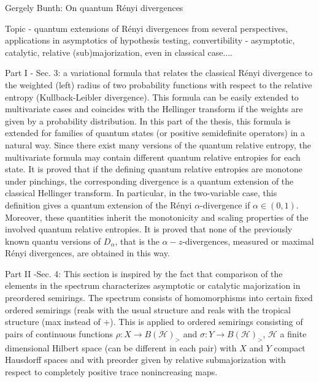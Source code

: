 \documentclass[12pt]{article}
\begin{document}
\begin{center}
{\large Gergely Bunth: On quantum R\'enyi divergences }

\end{center}
\medskip


\bigskip

Topic - quantum extensions of R\'enyi divergences from several perspectives, 
applications in asymptotics of hypothesis testing, convertibility - asymptotic, catalytic, relative
(sub)majorization, even in classical case....

Part I - Sec. 3: a variational formula that relates the classical R\'enyi divergence to the
weighted (left) radius of two probability functions with respect to the relative entropy
(Kullback-Leibler divergence). This formula can be easily extended to multivariate
cases and coincides with the Hellinger transform if the weights are given by a probability
distribution.
In this part of the thesis, this formula is extended for families of quantum states
(or positive semidefinite operators) in a natural way. Since there exist many versions of the quantum
relative entropy, the multivariate formula may contain different quantum relative
entropies for each state. It is proved that if the defining quantum relative entropies are
monotone under pinchings, the corresponding divergence is a quantum extension of the
classical Hellinger transform. In particular, in the two-variable case, this definition gives a quantum extension of the 
R\'enyi $\alpha$-divergence if $\alpha\in (0,1)$. Moreover, these quantities inherit the
monotonicity and scaling properties of the involved quantum relative entropies.
It is proved that none of the previously known quantu versions of $D_\alpha$, that is the
$\alpha-z$-divergences, measured or maximal R\'enyi divergences, are obtained in this way.


Part II -Sec. 4: This section is inspired by the fact  that comparison of the  elements in the
spectrum characterizes asymptotic or catalytic majorization in preordered semirings. 
The spectrum consists of homomorphisms into certain fixed ordered semirings (reals with
the usual structure and reals with the tropical structure (max instead of +). 
This is applied to ordered semirings consisting of  pairs of continuous functions $\rho:X\to B(\mathcal H)_>$ and
$\sigma:Y\to B(\mathcal H)_>$, $\mathcal H$ a finite dimensional Hilbert space (can be
different in each pair) with $X$ and $Y$ compact Hausdorff spaces and with preorder given by
relative submajorization with respect to completely positive trace nonincreasing maps. 
\end{document}
